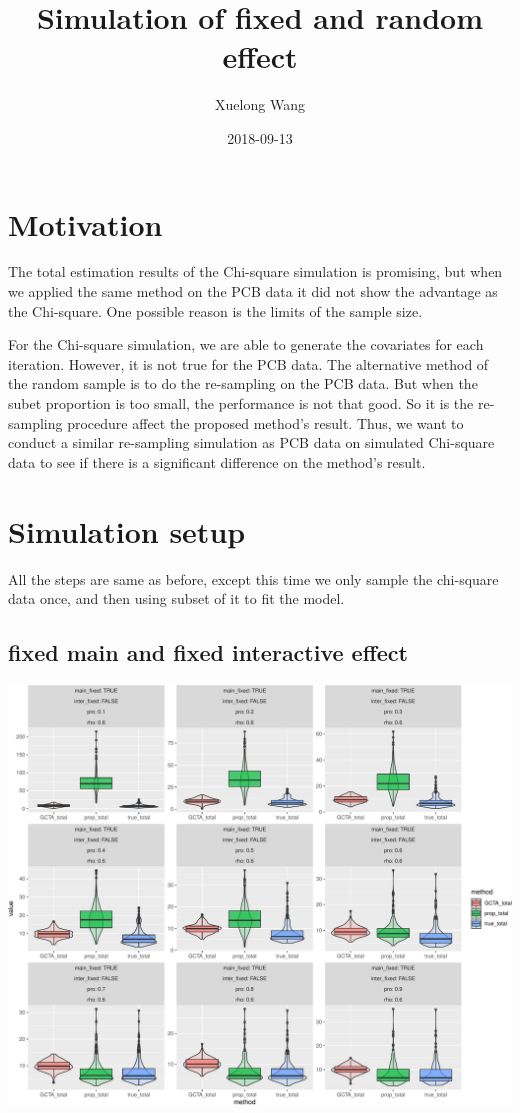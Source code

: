 \documentclass[]{article}
\title{Simulation of fixed and random effect}
\author{Xuelong Wang}
\date{2018-09-13}
\begin{document}
\maketitle

{
\setcounter{tocdepth}{2}
\tableofcontents
}
\section{Motivation}\label{motivation}

The total estimation results of the Chi-square simulation is promising,
but when we applied the same method on the PCB data it did not show the
advantage as the Chi-square. One possible reason is the limits of the
sample size.

For the Chi-square simulation, we are able to generate the covariates
for each iteration. However, it is not true for the PCB data. The
alternative method of the random sample is to do the re-sampling on the
PCB data. But when the subet proportion is too small, the performance is
not that good. So it is the re-sampling procedure affect the proposed
method's result. Thus, we want to conduct a similar re-sampling
simulation as PCB data on simulated Chi-square data to see if there is a
significant difference on the method's result.

\section{Simulation setup}\label{simulation-setup}

All the steps are same as before, except this time we only sample the
chi-square data once, and then using subset of it to fit the model.

\subsection{fixed main and fixed interactive
effect}\label{fixed-main-and-fixed-interactive-effect}

\includegraphics{Simulation_report_chi_resamle_files/figure-latex/fixed fixed-1.pdf}
\end{document}
